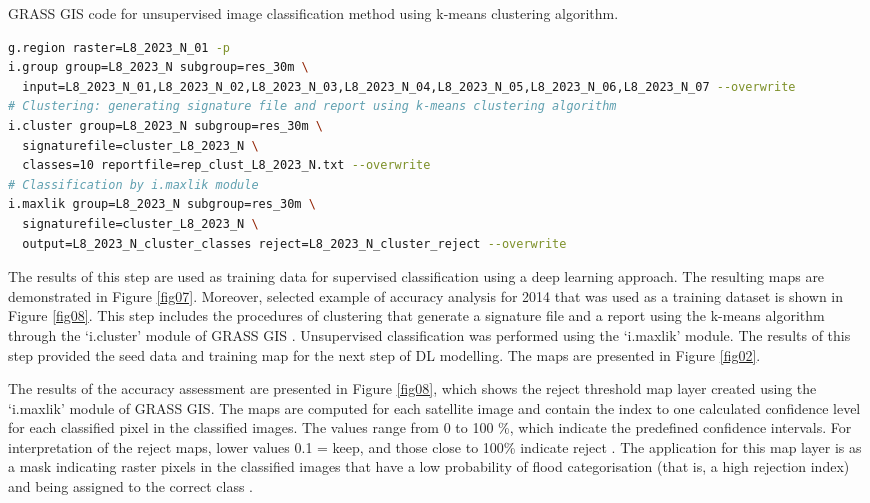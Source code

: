 \documentclass[water,article,accept,pdftex,oneauhor]{Definitions/mdpi}
\begin{document}
\begin{listing}[H]

\caption{GRASS GIS code for unsupervised image classification method using k-means clustering algorithm.}\label{lst02}

\begin{lstlisting}[language=bash,style=mystyle,label={lst02}]
g.region raster=L8_2023_N_01 -p
i.group group=L8_2023_N subgroup=res_30m \
  input=L8_2023_N_01,L8_2023_N_02,L8_2023_N_03,L8_2023_N_04,L8_2023_N_05,L8_2023_N_06,L8_2023_N_07 --overwrite
# Clustering: generating signature file and report using k-means clustering algorithm
i.cluster group=L8_2023_N subgroup=res_30m \
  signaturefile=cluster_L8_2023_N \
  classes=10 reportfile=rep_clust_L8_2023_N.txt --overwrite
# Classification by i.maxlik module
i.maxlik group=L8_2023_N subgroup=res_30m \
  signaturefile=cluster_L8_2023_N \
  output=L8_2023_N_cluster_classes reject=L8_2023_N_cluster_reject --overwrite
\end{lstlisting}
\end{listing}

\vspace{-6pt}

The results of this step{ }are used as training data for supervised classification using a deep learning approach. {The resulting maps are demonstrated in Figure} \ref{fig07}. Moreover,{ }selected example of accuracy analysis for 2014 that was used as a training dataset is shown in Figure \ref{fig08}. This step includes the procedures of clustering that generate a signature file and {a report} using the k-means algorithm {through} the `i.cluster' module {of GRASS GIS}%
. Unsupervised classification was performed using the `i.maxlik' module. The results of this step provided the seed data and training map for the next step of DL modelling{. The maps are presented in Figure} \ref{fig02}.

The results of the accuracy assessment are presented in Figure \ref{fig08}, which shows the reject threshold map layer created using the `i.maxlik' module of GRASS GIS. The maps are computed for each satellite image and contain the index to one calculated confidence level for each classified pixel in the classified images. The values range from 0 to 100 \%, which indicate the predefined confidence intervals. For interpretation of the reject maps, lower %
 values 0.1 = keep, and those close to 100\% indicate reject%
 . The application for this map layer is as a mask indicating raster pixels in the classified images that have a low probability of flood categorisation (that is, a high rejection index) and being assigned to the correct class%
 . 
\end{document}
